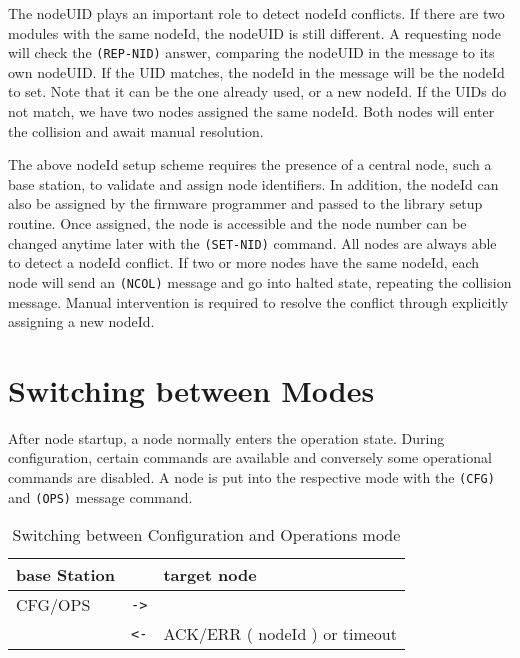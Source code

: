 The nodeUID plays an important role to detect nodeId conflicts. If there are two modules with the same nodeId, the nodeUID is still different. A requesting node will check the \texttt{(REP-NID)} answer, comparing the nodeUID in the message to its own nodeUID. If the UID matches, the nodeId in the message will be the nodeId to set. Note that it can be the one already used, or a new nodeId. If the UIDs do not match, we have two nodes assigned the same nodeId. Both nodes will enter the collision and await manual resolution.

The above nodeId setup scheme requires the presence of a central node, such a base station, to validate and assign node identifiers. In addition, the nodeId can also be assigned by the firmware programmer and passed to the library setup routine. Once assigned, the node is accessible and the node number can be changed anytime later with the \texttt{(SET-NID)} command. All nodes are always able to detect a nodeId conflict. If two or more nodes have the same nodeId, each node will send an \texttt{(NCOL)} message and go into halted state, repeating the collision message. Manual intervention is required to resolve the conflict through explicitly assigning a new nodeId.

\section{Switching between Modes}

After node startup, a node normally enters the operation state. During configuration, certain commands are available and conversely some operational commands are disabled. A node is put into the respective mode with the \texttt{(CFG)} and \texttt{(OPS)} message command.

\begin{table}[ht!]
    \begin{center}
        \caption{Switching between Configuration and Operations mode}
        \begin{tabular}{|p{} c p{}|}
            \toprule
            \textbf{base Station} & & \textbf{target node} \\
            \midrule
            CFG/OPS & \texttt{->} & \\
            & \texttt{<-} & ACK/ERR ( nodeId ) or timeout \\
            \bottomrule
        \end{tabular}
    \end{center}
\end{table}

